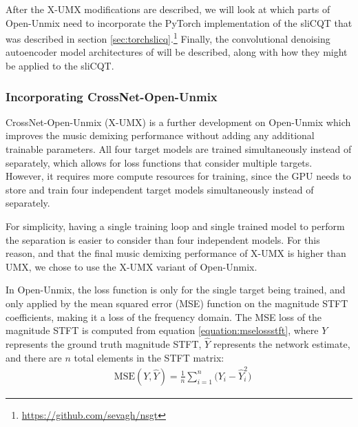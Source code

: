 \documentclass[report.tex]{subfiles}
\begin{document}
After the X-UMX modifications are described, we will look at which parts of Open-Unmix need to incorporate the PyTorch implementation of the sliCQT that was described in section \ref{sec:torchslicq}.\footnote{\url{https://github.com/sevagh/nsgt}} Finally, the convolutional denoising autoencoder model architectures of \textcite{plumbley1, plumbley2}  will be described, along with how they might be applied to the sliCQT.

\subsubsection{Incorporating CrossNet-Open-Unmix}
\label{sec:xumxinc}

CrossNet-Open-Unmix (X-UMX) \parencite{xumx} is a further development on Open-Unmix which improves the music demixing performance without adding any additional trainable parameters. All four target models are trained simultaneously instead of separately, which allows for loss functions that consider multiple targets. However, it requires more compute resources for training, since the GPU needs to store and train four independent target models simultaneously instead of separately.

For simplicity, having a single training loop and single trained model to perform the separation is easier to consider than four independent models. For this reason, and that the final music demixing performance of X-UMX is higher than UMX, we chose to use the X-UMX variant of Open-Unmix.

In Open-Unmix, the loss function is only for the single target being trained, and only applied by the mean squared error (MSE) function on the magnitude STFT coefficients, making it a loss of the frequency domain. The MSE loss of the magnitude STFT is computed from equation \eqref{equation:mselossstft}, where $Y$ represents the ground truth magnitude STFT, $\hat{Y}$ represents the network estimate, and there are $n$ total elements in the STFT matrix:
\begin{align}\tag{31}\label{equation:mselossstft}
	\nonumber & \text{MSE}(Y, \hat{Y}) = \frac{1}{n} \sum_{i = 1}^{n}{(Y_{i}-\hat{Y}_{i}^{2}})
\end{align}
\end{document}
